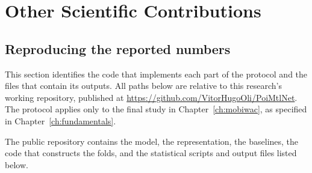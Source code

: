 
\chapter{Other Scientific Contributions}
\label{apx:contributions}

\section{Reproducing the reported numbers}
\label{apx:contributions:repro}

This section identifies the code that implements each part of the protocol and the files
that contain its outputs. All paths below are relative to this research's working
repository, published at \url{https://github.com/VitorHugoOli/PoiMtlNet}. The protocol
applies only to the final study in Chapter~\ref{ch:mobiwac}, as specified in
Chapter~\ref{ch:fundamentals}.

The public repository contains the model, the representation, the baselines, the code
that constructs the folds, and the statistical scripts and output files listed below.

